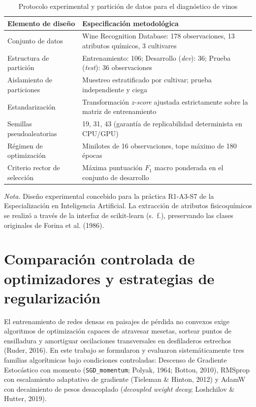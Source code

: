 \documentclass[12pt,letterpaper]{article}
\newcommand{\nota}[1]{\par\noindent\small\textit{Nota.} #1\par\normalsize}
\begin{document}
\begin{table}[H]\caption{Protocolo experimental y partición de datos para el diagnóstico de vinos}\label{tab:protocolo}
\begin{singlespace}\small\centering\begin{tabularx}{\textwidth}{>{\raggedright\arraybackslash}p{} X}\toprule
Elemento de diseño & Especificación metodológica \\\midrule
Conjunto de datos & Wine Recognition Database: 178 observaciones, 13 atributos químicos, 3 cultivares \\
Estructura de partición & Entrenamiento: 106; Desarrollo (\textit{dev}): 36; Prueba (\textit{test}): 36 observaciones \\
Aislamiento de particiones & Muestreo estratificado por cultivar; prueba independiente y ciega \\
Estandarización & Transformación \textit{z-score} ajustada estrictamente sobre la matriz de entrenamiento \\
Semillas pseudoaleatorias & 19, 31, 43 (garantía de replicabilidad determinista en CPU/GPU) \\
Régimen de optimización & Minilotes de 16 observaciones, tope máximo de 180 épocas \\
Criterio rector de selección & Máxima puntuación $F_1$ macro ponderada en el conjunto de desarrollo \\\bottomrule
\end{tabularx}\end{singlespace}\nota{Diseño experimental concebido para la práctica R1-A3-S7 de la Especialización en Inteligencia Artificial. La extracción de atributos fisicoquímicos se realizó a través de la interfaz de scikit-learn (s.~f.), preservando las clases originales de Forina et al. (1986).}
\end{table}

\section{Comparación controlada de optimizadores y estrategias de regularización}
El entrenamiento de redes densas en paisajes de pérdida no convexos exige algoritmos de optimización capaces de atravesar mesetas, sortear puntos de ensilladura y amortiguar oscilaciones transversales en desfiladeros estrechos (Ruder, 2016). En este trabajo se formularon y evaluaron sistemáticamente tres familias algorítmicas bajo condiciones controladas: Descenso de Gradiente Estocástico con momento (\texttt{SGD\_momentum}; Polyak, 1964; Bottou, 2010), RMSprop con escalamiento adaptativo de gradiente (Tieleman \& Hinton, 2012) y AdamW con decaimiento de pesos desacoplado (\textit{decoupled weight decay}; Loshchilov \& Hutter, 2019).
\end{document}
